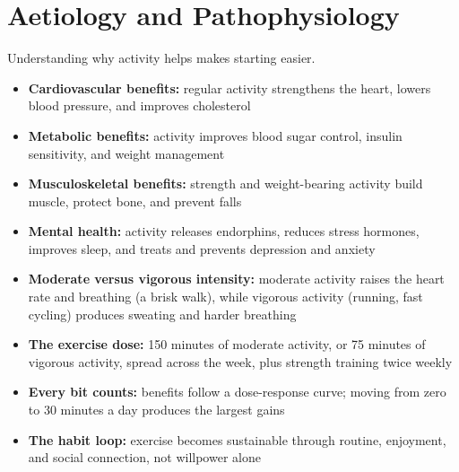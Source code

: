 \section*{Aetiology and Pathophysiology}
Understanding why activity helps makes starting easier.
\begin{itemize}
    \item \textbf{Cardiovascular benefits:} regular activity strengthens the heart, lowers blood pressure, and improves cholesterol
    \item \textbf{Metabolic benefits:} activity improves blood sugar control, insulin sensitivity, and weight management
    \item \textbf{Musculoskeletal benefits:} strength and weight-bearing activity build muscle, protect bone, and prevent falls
    \item \textbf{Mental health:} activity releases endorphins, reduces stress hormones, improves sleep, and treats and prevents depression and anxiety
    \item \textbf{Moderate versus vigorous intensity:} moderate activity raises the heart rate and breathing (a brisk walk), while vigorous activity (running, fast cycling) produces sweating and harder breathing
    \item \textbf{The exercise dose:} 150 minutes of moderate activity, or 75 minutes of vigorous activity, spread across the week, plus strength training twice weekly
    \item \textbf{Every bit counts:} benefits follow a dose-response curve; moving from zero to 30 minutes a day produces the largest gains
    \item \textbf{The habit loop:} exercise becomes sustainable through routine, enjoyment, and social connection, not willpower alone
\end{itemize}

